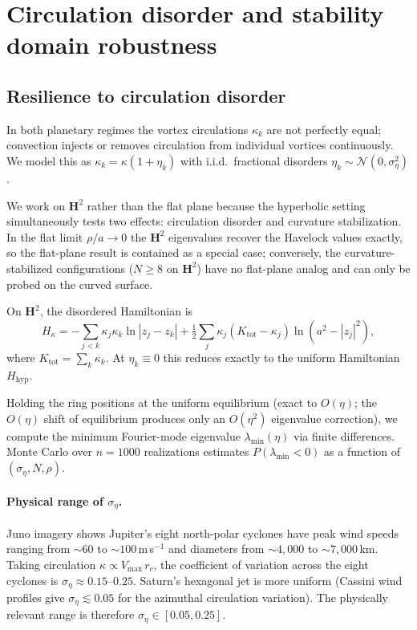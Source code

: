 \section{Circulation disorder and stability domain robustness}
\label{sec:disorder-new}

\subsection{Resilience to circulation disorder}
\label{sec:disorder}

In both planetary regimes the vortex circulations $\kappa_k$ are not
perfectly equal; convection injects or removes circulation from individual
vortices continuously.  We model this as $\kappa_k = \kappa(1+\eta_k)$
with i.i.d.\ fractional disorders $\eta_k \sim \mathcal{N}(0,\sigma_\eta^2)$.

We work on $\mathbf{H}^2$ rather than the flat plane because the
hyperbolic setting simultaneously tests two effects: circulation
disorder and curvature stabilization.  In the flat limit
$\rho/a \to 0$ the $\mathbf{H}^2$ eigenvalues recover the Havelock
values exactly, so the flat-plane result is contained as a special
case; conversely, the curvature-stabilized configurations ($N \ge 8$
on $\mathbf{H}^2$) have no flat-plane analog and can only be probed
on the curved surface.

On $\mathbf{H}^2$, the disordered Hamiltonian is
\begin{equation}\label{eq:H_kappa}
  H_\kappa = -\sum_{j<k}\kappa_j\kappa_k\ln|z_j - z_k|
  + \tfrac12\sum_j\kappa_j(K_{\mathrm{tot}}-\kappa_j)\ln(a^2 - |z_j|^2),
\end{equation}
where $K_{\mathrm{tot}} = \sum_k\kappa_k$.  At $\eta_k \equiv 0$ this
reduces exactly to the uniform Hamiltonian $H_{\mathrm{hyp}}$.

Holding the ring positions at the uniform equilibrium (exact to $O(\eta)$;
the $O(\eta)$ shift of equilibrium produces only an $O(\eta^2)$ eigenvalue
correction), we compute the minimum Fourier-mode eigenvalue
$\lambda_{\min}(\eta)$ via finite differences.  Monte Carlo over
$n = 1000$ realizations estimates $P(\lambda_{\min} < 0)$ as a function
of $(\sigma_\eta, N, \rho)$.

\paragraph{Physical range of $\sigma_\eta$.}
Juno imagery \citep{Adriani2018,Gavriel2021} shows Jupiter's eight
north-polar cyclones have peak wind speeds ranging from
$\sim\!60$ to $\sim\!100$\,m\,s$^{-1}$ and diameters from
$\sim\!4{,}000$ to $\sim\!7{,}000$\,km.  Taking circulation
$\kappa \propto V_{\max}\,r_c$, the coefficient of variation across
the eight cyclones is $\sigma_\eta \approx 0.15$--$0.25$.  Saturn's
hexagonal jet is more uniform (Cassini wind profiles give
$\sigma_\eta \lesssim 0.05$ for the azimuthal circulation variation).
The physically relevant range is therefore
$\sigma_\eta \in [0.05, 0.25]$.

